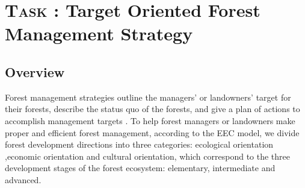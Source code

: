 \section{\textsc {Task \uppercase\expandafter{}}: Target Oriented Forest Management Strategy}

\subsection{Overview}
Forest management strategies outline the managers' or landowners' target for their forests, describe the status quo of the forests, and give a plan of actions to accomplish management targets \cite{plan}. To help forest managers or landowners make proper and efficient forest management, according to the EEC model, we divide forest development directions into three categories: ecological orientation ,economic orientation and cultural orientation, which correspond to the three development stages of the forest ecosystem: elementary, intermediate and advanced.









